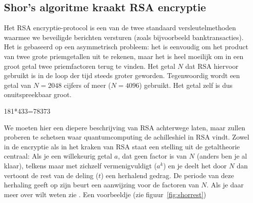 \documentclass[../../main.tex]{subfiles}
\begin{document}
\onlyinsubfile{\setcounter{chapter}{8}}
\notinsubfile{}
\subsection*{Shor's algoritme kraakt RSA encryptie}
Het RSA encryptie-protocol is een van de twee standaard versleutelmethoden waarmee we beveiligde berichten versturen (zoals bijvoorbeeld banktransacties). 
Het is gebaseerd op een asymmetrisch probleem: het is eenvoudig om het product van twee grote priemgetallen uit te rekenen, maar het is heel moeilijk om in een groot getal twee priemfactoren terug te vinden. Het getal $N$ dat RSA hiervoor gebruikt is in de loop der tijd steeds groter geworden. Tegenwoordig wordt een getal van $N=2048$ cijfers of meer ($N=4096$) gebruikt. Het getal zelf is dus onuitspreekbaar groot.

\begin{antwoord}[3.5cm]
181*433=78373
\end{antwoord}

We moeten hier een diepere beschrijving van RSA achterwege laten, maar zullen proberen te schetsen waar quantumcomputing de achilleshiel in RSA vindt. Zowel in de encryptie als in het kraken van RSA staat een stelling uit de getaltheorie centraal:  Als je een willekeurig getal $a$, dat geen factor is van $N$ (anders ben je al klaar), telkens maar met zichzelf vermenigvuldigt ($a^k$) en je deelt het door $N$ dan vertoont de rest van de deling ($t$) een herhalend gedrag. De periode van deze herhaling geeft op zijn beurt een aanwijzing voor de factoren van $N$. Als je daar meer over wilt weten zie \cite{Aaronson2007,Wolf2021}. Een voorbeeldje (zie figuur~\ref{fig:shorrest})

\end{document}
